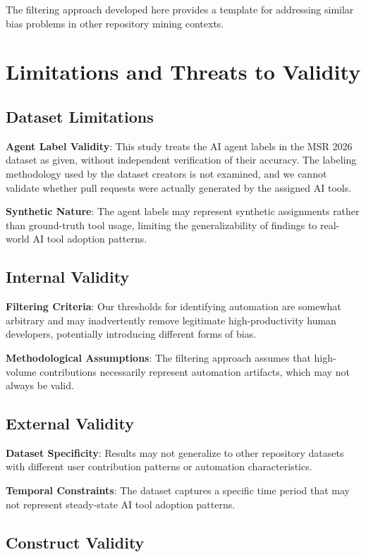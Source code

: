\documentclass[conference]{IEEEtran}
\begin{document}
The filtering approach developed here provides a template for addressing similar bias problems in other repository mining contexts.

\section{Limitations and Threats to Validity}

\subsection{Dataset Limitations}

\textbf{Agent Label Validity}: This study treats the AI agent labels in the MSR 2026 dataset as given, without independent verification of their accuracy. The labeling methodology used by the dataset creators is not examined, and we cannot validate whether pull requests were actually generated by the assigned AI tools.

\textbf{Synthetic Nature}: The agent labels may represent synthetic assignments rather than ground-truth tool usage, limiting the generalizability of findings to real-world AI tool adoption patterns.

\subsection{Internal Validity}

\textbf{Filtering Criteria}: Our thresholds for identifying automation are somewhat arbitrary and may inadvertently remove legitimate high-productivity human developers, potentially introducing different forms of bias.

\textbf{Methodological Assumptions}: The filtering approach assumes that high-volume contributions necessarily represent automation artifacts, which may not always be valid.

\subsection{External Validity}

\textbf{Dataset Specificity}: Results may not generalize to other repository datasets with different user contribution patterns or automation characteristics.

\textbf{Temporal Constraints}: The dataset captures a specific time period that may not represent steady-state AI tool adoption patterns.

\subsection{Construct Validity}
\end{document}
